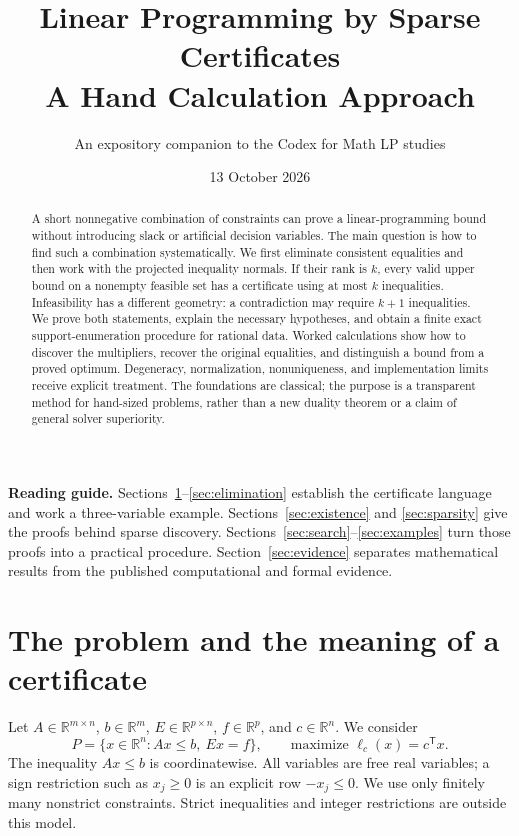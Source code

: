 \documentclass[11pt,letterpaper]{article}
\title{\vspace{-1.0cm}\textbf{Linear Programming by Sparse Certificates}\\[5pt]
\large A Hand Calculation Approach}
\author{An expository companion to the Codex for Math LP studies}
\date{13 October 2026}
\newcommand{\R}{\mathbb R}
\newcommand{\T}{\mathsf T}
\theoremstyle{definition}
\theoremstyle{remark}
\numberwithin{equation}{section}
\begin{document}
\maketitle
\thispagestyle{plain}
\begin{abstract}
A short nonnegative combination of constraints can prove a linear-programming
bound without introducing slack or artificial decision variables. The main
question is how to find such a combination systematically. We first eliminate
consistent equalities and then work with the projected inequality normals.
If their rank is \(k\), every valid upper bound on a nonempty feasible set has
a certificate using at most \(k\) inequalities. Infeasibility has a different
geometry: a contradiction may require \(k+1\) inequalities. We prove both
statements, explain the necessary hypotheses, and obtain a finite exact
support-enumeration procedure for rational data. Worked calculations show how
to discover the multipliers, recover the original equalities, and distinguish
a bound from a proved optimum. Degeneracy, normalization, nonuniqueness, and
implementation limits receive explicit treatment. The foundations are
classical; the purpose is a transparent method for hand-sized problems,
rather than a new duality theorem or a claim of general solver superiority.
\end{abstract}

\noindent\textbf{Reading guide.}
Sections~\ref{sec:certificates}--\ref{sec:elimination} establish the certificate
language and work a three-variable example. Sections~\ref{sec:existence} and
\ref{sec:sparsity} give the proofs behind sparse discovery.
Sections~\ref{sec:search}--\ref{sec:examples} turn those proofs into a practical
procedure. Section~\ref{sec:evidence} separates mathematical results from the
published computational and formal evidence.

\section{The problem and the meaning of a certificate}
\label{sec:certificates}

Let \(A\in\R^{m\times n}\), \(b\in\R^m\),
\(E\in\R^{p\times n}\), \(f\in\R^p\), and \(c\in\R^n\). We consider
\begin{equation}\label{eq:model}
 P=\{x\in\R^n:Ax\le b,\ Ex=f\},
 \qquad \text{maximize }\ell_c(x)=c^\T x .
\end{equation}
The inequality \(Ax\le b\) is coordinatewise. All variables are free real
variables; a sign restriction such as \(x_j\ge0\) is an explicit row
\(-x_j\le0\). We use only finitely many nonstrict constraints.
Strict inequalities and integer restrictions are outside this model.
\end{document}

